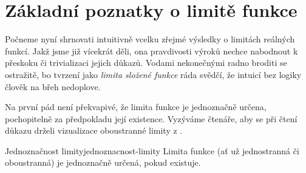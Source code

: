 \section{Základní poznatky o limitě funkce}
\label{sec:zakladni-poznatky-o-limite-funkce}

Počneme nyní shrnovati intuitivně vcelku zřejmé výsledky o limitách reálných
funkcí. Jakž jsme již vícekrát děli, ona  pravdivosti
výroků nechce nabodnout k přeskoku či trivializaci jejich důkazů. Vodami
nekonečnými radno broditi se ostražitě, bo tvrzení jako \emph{limita složené
	funkce} %
ráda svědčí, že intuicí bez logiky člověk na břeh nedoplove.

Na první pád není překvapivé, že limita funkce je jednoznačně určena,
pochopitelně za předpokladu její existence. Vyzýváme čtenáře, aby se při čtení
důkazu drželi vizualizace oboustranné limity z
.

\begin{lemma}{Jednoznačnost limity}{jednoznacnost-limity}
	Limita funkce (ať už jednostranná či oboustranná) je jednoznačně určená, pokud
	existuje.
\end{lemma}

